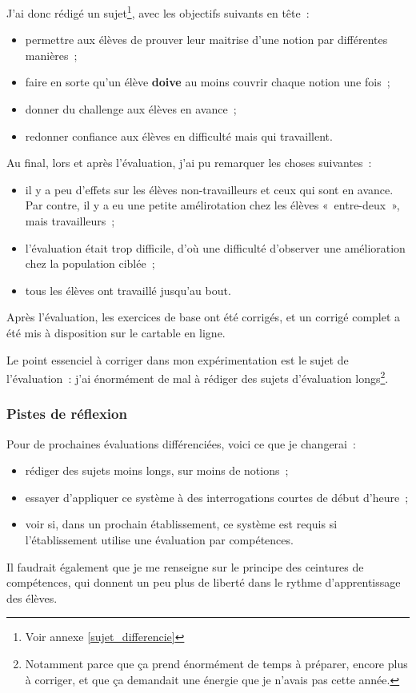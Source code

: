 J'ai donc rédigé un sujet\footnote{Voir annexe \ref{sujet_differencie}}, avec les objectifs suivants
en tête :

\begin{itemize}
    \item permettre aux élèves de prouver leur maitrise d'une notion par différentes manières ;
    \item faire en sorte qu'un élève \textbf{doive} au moins couvrir chaque notion une fois ;
    \item donner du challenge aux élèves en avance ;
    \item redonner confiance aux élèves en difficulté mais qui travaillent.
\end{itemize}

Au final, lors et après l'évaluation, j'ai pu remarquer les choses suivantes :
\begin{itemize}
    \item il y a peu d'effets sur les élèves non-travailleurs et ceux qui sont
    en avance. Par contre, il y a eu une petite amélirotation chez les élèves
    « entre-deux », mais travailleurs ;
    \item l'évaluation était trop difficile, d'où une difficulté d'observer une
    amélioration chez la population ciblée ;
    \item tous les élèves ont travaillé jusqu'au bout.
\end{itemize}

Après l'évaluation, les exercices de base ont été corrigés, et un corrigé complet
a été mis à disposition sur le cartable en ligne.

Le point essenciel à corriger dans mon expérimentation est le sujet de l'évaluation :
j'ai énormément de mal à rédiger des sujets d'évaluation longs\footnote{
Notamment parce que ça prend énormément de temps à préparer, encore plus à corriger,
et que ça demandait une énergie que je n'avais pas cette année.
}.

\subsubsection{Pistes de réflexion}

Pour de prochaines évaluations différenciées, voici ce que je changerai :
\begin{itemize}
    \item rédiger des sujets moins longs, sur moins de notions ;
    \item essayer d'appliquer ce système à des interrogations courtes de début d'heure ;
    \item voir si, dans un prochain établissement, ce système est requis si l'établissement
    utilise une évaluation par compétences.
\end{itemize}

Il faudrait également que je me renseigne sur le principe des ceintures de compétences,
qui donnent un peu plus de liberté dans le rythme d'apprentissage des élèves.
